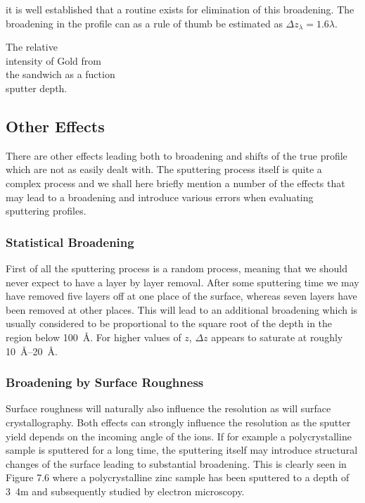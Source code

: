 it is well established that a routine exists for elimination of this broadening. The broadening in the profile can as a rule of thumb be estimated as $\Delta z_{\lambda}= 1.6 \lambda$.

 \vspace{1cm}

  The relative\\ intensity of Gold
 from\\ the sandwich as a fuction\\ sputter depth.\\

 \vspace{8cm}

\subsection{Other Effects}
There are other effects leading both to broadening and shifts of the true profile which are not as easily dealt with. The sputtering process itself is quite a complex process and we shall here briefly mention a number of the effects that may lead to a broadening and introduce various errors when evaluating sputtering profiles.

\subsubsection{Statistical Broadening}
First of all the sputtering process is a random process, meaning that we should never expect to have a layer by layer removal. After some sputtering time we may have removed five layers off at one place of the surface, whereas seven layers have been removed at other places. This will lead to an additional broadening which is usually considered to be proportional to the square root of the depth in the region below \SI{100}{\angstrom}. For higher values of $z$, $\Delta z$ appears to saturate at roughly \SIrange{10}{20}{\angstrom}.

\subsubsection{Broadening by Surface Roughness}
Surface roughness will naturally also influence the resolution as will surface crystallography. Both effects can strongly influence the resolution as the sputter yield depends on the incoming angle of the ions. If for example a polycrystalline sample is sputtered for a long time, the sputtering itself may introduce structural changes of the surface leading to substantial broadening. This is clearly seen in Figure 7.6 where a polycrystalline zinc sample has been sputtered to a depth of \SI{3}{4}{\micro m} and subsequently studied by electron microscopy.

